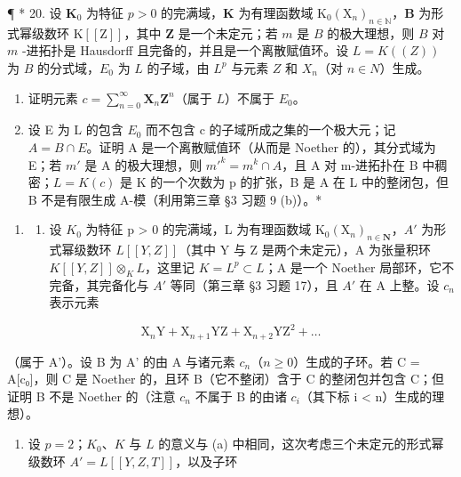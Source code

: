¶ * 20. 设 \(\mathbf{K}_0\) 为特征 \(p > 0\) 的完满域，\(\mathbf{K}\) 为有理函数域 \(\mathrm{K}_0(\mathrm{X}_n)_{n \in \mathbb{N}}\)，\(\mathbf{B}\) 为形式幂级数环 \(\mathrm{K}[[\mathrm{Z}]]\)，其中 \(\mathbf{Z}\) 是一个未定元；若 \(m\) 是 \(B\) 的极大理想，则 \(B\) 对 \(m\) -进拓扑是 Hausdorff 且完备的，并且是一个离散赋值环。设 \(L = K((Z))\) 为 \(B\) 的分式域，\(E_0\) 为 \(L\) 的子域，由 \(L^p\) 与元素 \(Z\) 和 \(X_n\)（对 \(n \in N\)）生成。

\begin{enumerate}
\def\labelenumi{(\alph{enumi})}
\item
  证明元素 \(c = \sum_{n=0}^{\infty} \mathbf{X}_n \mathbf{Z}^n\)（属于 \(L\)）不属于 \(E_0\)。
\item
  设 E 为 L 的包含 \(E_{0}\) 而不包含 c 的子域所成之集的一个极大元；记 \(A = B \cap E\)。证明 A 是一个离散赋值环（从而是 Noether 的），其分式域为 E；若 \(m'\) 是 A 的极大理想，则 \(m'^{k} = m^{k} \cap A\)，且 A 对 m-进拓扑在 B 中稠密；\(L = K(c)\) 是 K 的一个次数为 p 的扩张，B 是 A 在 L 中的整闭包，但 B 不是有限生成 A-模（利用第三章 §3 习题 9 (b)）。*
\end{enumerate}

\begin{enumerate}
\def\labelenumi{\arabic{enumi}.}
\setcounter{enumi}{20}
\tightlist
\item
  \begin{enumerate}
  \def\labelenumii{(\alph{enumii})}
  \tightlist
  \item
    设 \(K_{0}\) 为特征 p \textgreater{} 0 的完满域，L 为有理函数域 \(\mathrm{K}_{0}(\mathrm{X}_{n})_{n\in\mathbf{N}}\)，\(A'\) 为形式幂级数环 \(L[[Y,Z]]\)（其中 Y 与 Z 是两个未定元），A 为张量积环 \(K[[Y,Z]]\otimes_{K}L\)，这里记 \(K = L^{p} \subset L\)；A 是一个 Noether 局部环，它不完备，其完备化与 \(A'\) 等同（第三章 §3 习题 17），且 \(A'\) 在 A 上整。设 \(c_{n}\) 表示元素
  \end{enumerate}
\end{enumerate}

\[
\mathrm{X} _ {n} \mathrm{Y} + \mathrm{X} _ {n + 1} \mathrm{YZ} + \mathrm{X} _ {n + 2} \mathrm{YZ} ^ {2} + \dots
\]

（属于 A'）。设 B 为 A' 的由 A 与诸元素 \(c_{n}\)（\(n \geqslant 0\)）生成的子环。若 C = A{[}c₀{]}，则 C 是 Noether 的，且环 B（它不整闭）含于 C 的整闭包并包含 C；但证明 B 不是 Noether 的（注意 \(c_{n}\) 不属于 B 的由诸 \(c_{i}\)（其下标 i \textless{} n）生成的理想）。

\begin{enumerate}
\def\labelenumi{(\alph{enumi})}
\setcounter{enumi}{1}
\tightlist
\item
  设 \(p = 2\)；\(K_0\)、\(K\) 与 \(L\) 的意义与 (a) 中相同，这次考虑三个未定元的形式幂级数环 \(A' = L[[Y, Z, T]]\)，以及子环
\end{enumerate}

